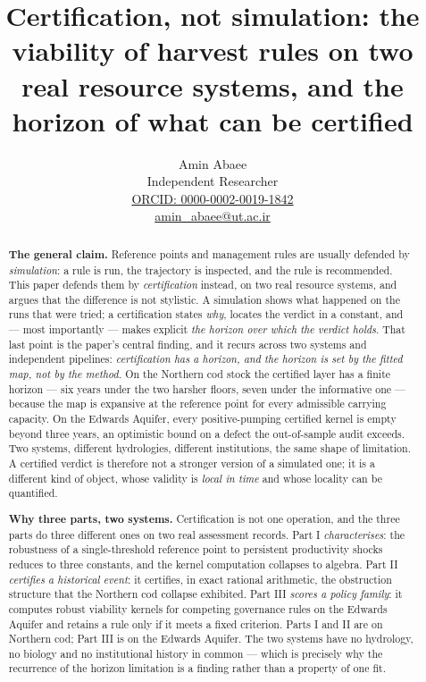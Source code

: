 \title{Certification, not simulation: the viability of harvest rules on two real resource systems, and the horizon of what can be certified}
\author{Amin Abaee\\[0.35em]
{\small Independent Researcher}\\[0.55em]
{\small\href{https://orcid.org/0000-0002-0019-1842}{ORCID: 0000-0002-0019-1842}}\\[0.3em]
{\small\href{mailto:amin\_abaee@ut.ac.ir}{amin\_abaee@ut.ac.ir}}}
\date{}
\maketitle
\begin{abstract}
\noindent\textbf{The general claim.} Reference points and management rules are usually defended by
\emph{simulation}: a rule is run, the trajectory is inspected, and the rule is recommended. This
paper defends them by \emph{certification} instead, on two real resource systems, and argues that
the difference is not stylistic. A simulation shows what happened on the runs that were tried; a
certification states \emph{why}, locates the verdict in a constant, and --- most importantly ---
makes explicit \emph{the horizon over which the verdict holds}. That last point is the paper's
central finding, and it recurs across two systems and independent pipelines: \emph{certification has
a horizon, and the horizon is set by the fitted map, not by the method.} On the Northern cod stock
the certified layer has a finite horizon --- six years under the two harsher floors, seven under the
informative one --- because the map is expansive at the reference point for every admissible carrying
capacity. On the Edwards Aquifer, every positive-pumping certified kernel is empty beyond three
years, an optimistic bound on a defect the out-of-sample audit exceeds. Two systems, different
hydrologies, different institutions, the same shape of limitation. A certified verdict is therefore
not a stronger version of a simulated one; it is a different kind of object, whose validity is
\emph{local in time} and whose locality can be quantified.

\noindent\textbf{Why three parts, two systems.} Certification is not one operation, and the three
parts do three different ones on two real assessment records. Part I \emph{characterises}: the
robustness of a single-threshold reference point to persistent productivity shocks reduces to three
constants, and the kernel computation collapses to algebra. Part II \emph{certifies a historical
event}: it certifies, in exact rational arithmetic, the obstruction structure that the Northern cod
collapse exhibited. Part III \emph{scores a policy family}: it computes robust viability kernels for
competing governance rules on the Edwards Aquifer and retains a rule only if it meets a fixed
criterion. Parts I and II are on Northern cod; Part III is on the Edwards Aquifer. The two systems
have no hydrology, no biology and no institutional history in common --- which is precisely why the
recurrence of the horizon limitation is a finding rather than a property of one fit.


\end{abstract}
